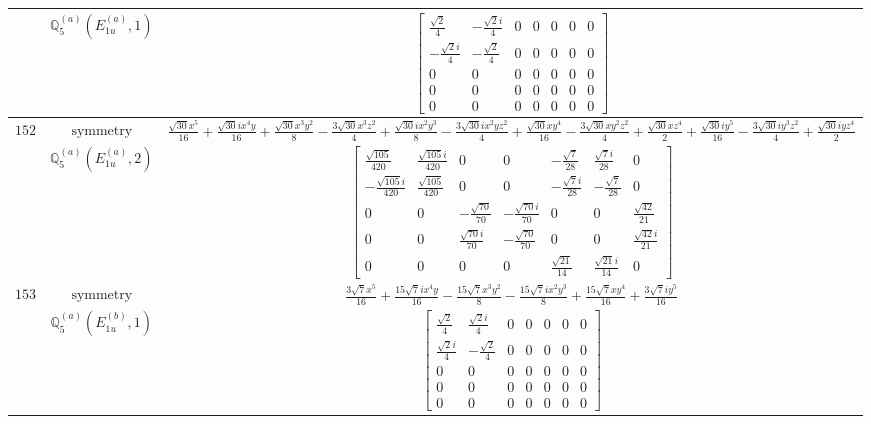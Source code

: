\documentclass[fleqn,8pt,landscape]{jsarticle}
\begin{document}
\begin{longtable}{ccc}
$  $ & $ \mathbb{Q}_{5}^{(a)}(E_{1u}^{(a)},1) $ & $ \begin{bmatrix} \frac{\sqrt{2}}{4} & - \frac{\sqrt{2} i}{4} & 0 & 0 & 0 & 0 & 0 \\ - \frac{\sqrt{2} i}{4} & - \frac{\sqrt{2}}{4} & 0 & 0 & 0 & 0 & 0 \\ 0 & 0 & 0 & 0 & 0 & 0 & 0 \\ 0 & 0 & 0 & 0 & 0 & 0 & 0 \\ 0 & 0 & 0 & 0 & 0 & 0 & 0 \end{bmatrix} $ \\ \hline
$ 152 $ & $ \text{symmetry} $ & $ \frac{\sqrt{30} x^{5}}{16} + \frac{\sqrt{30} i x^{4} y}{16} + \frac{\sqrt{30} x^{3} y^{2}}{8} - \frac{3 \sqrt{30} x^{3} z^{2}}{4} + \frac{\sqrt{30} i x^{2} y^{3}}{8} - \frac{3 \sqrt{30} i x^{2} y z^{2}}{4} + \frac{\sqrt{30} x y^{4}}{16} - \frac{3 \sqrt{30} x y^{2} z^{2}}{4} + \frac{\sqrt{30} x z^{4}}{2} + \frac{\sqrt{30} i y^{5}}{16} - \frac{3 \sqrt{30} i y^{3} z^{2}}{4} + \frac{\sqrt{30} i y z^{4}}{2} $ \\
$  $ & $ \mathbb{Q}_{5}^{(a)}(E_{1u}^{(a)},2) $ & $ \begin{bmatrix} \frac{\sqrt{105}}{420} & \frac{\sqrt{105} i}{420} & 0 & 0 & - \frac{\sqrt{7}}{28} & \frac{\sqrt{7} i}{28} & 0 \\ - \frac{\sqrt{105} i}{420} & \frac{\sqrt{105}}{420} & 0 & 0 & - \frac{\sqrt{7} i}{28} & - \frac{\sqrt{7}}{28} & 0 \\ 0 & 0 & - \frac{\sqrt{70}}{70} & - \frac{\sqrt{70} i}{70} & 0 & 0 & \frac{\sqrt{42}}{21} \\ 0 & 0 & \frac{\sqrt{70} i}{70} & - \frac{\sqrt{70}}{70} & 0 & 0 & \frac{\sqrt{42} i}{21} \\ 0 & 0 & 0 & 0 & \frac{\sqrt{21}}{14} & \frac{\sqrt{21} i}{14} & 0 \end{bmatrix} $ \\ \hline
$ 153 $ & $ \text{symmetry} $ & $ \frac{3 \sqrt{7} x^{5}}{16} + \frac{15 \sqrt{7} i x^{4} y}{16} - \frac{15 \sqrt{7} x^{3} y^{2}}{8} - \frac{15 \sqrt{7} i x^{2} y^{3}}{8} + \frac{15 \sqrt{7} x y^{4}}{16} + \frac{3 \sqrt{7} i y^{5}}{16} $ \\
$  $ & $ \mathbb{Q}_{5}^{(a)}(E_{1u}^{(b)},1) $ & $ \begin{bmatrix} \frac{\sqrt{2}}{4} & \frac{\sqrt{2} i}{4} & 0 & 0 & 0 & 0 & 0 \\ \frac{\sqrt{2} i}{4} & - \frac{\sqrt{2}}{4} & 0 & 0 & 0 & 0 & 0 \\ 0 & 0 & 0 & 0 & 0 & 0 & 0 \\ 0 & 0 & 0 & 0 & 0 & 0 & 0 \\ 0 & 0 & 0 & 0 & 0 & 0 & 0 \end{bmatrix} $ \\ \hline

\end{longtable}
\end{document}
